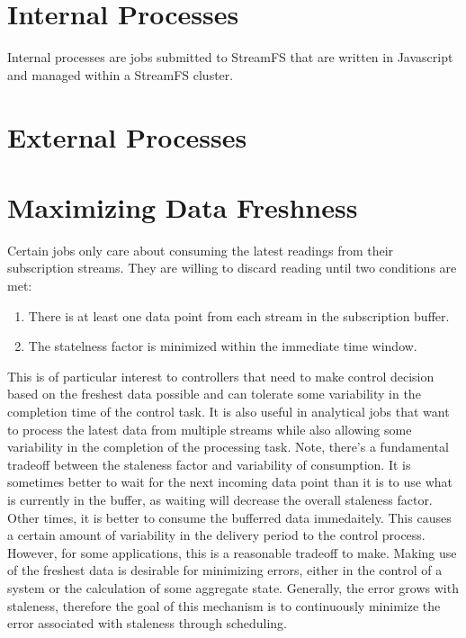 \section{Internal Processes}
Internal processes are jobs submitted to StreamFS that are written in Javascript and managed within a StreamFS cluster.




\section{External Processes}


\section{Maximizing Data Freshness}
Certain jobs only care about consuming the latest readings from their subscription streams.  They are willing to discard reading until two
conditions are met:

\begin{enumerate}
\item There is at least one data point from each stream in the subscription buffer.
\item The statelness factor is minimized within the immediate time window.
\end{enumerate}

This is of particular interest to controllers that need to make control decision based on the freshest data possible and can tolerate some variability
in the completion time of the control task.  It is also useful in analytical jobs that want to process the latest data from multiple streams while also
allowing some variability in the completion of the processing task.  Note, there's a fundamental tradeoff
between the staleness factor and variability of consumption.  It is sometimes better to wait for the next incoming data point than it is to use what
is currently in the buffer, as waiting will decrease the overall staleness factor.  Other times, it is better to consume the bufferred data immedaitely.
This causes a certain amount of variability in the delivery period to the control process.  However, for some applications, this is a reasonable tradeoff
to make.  Making use of the freshest data is desirable for minimizing errors, either in the control of a system or the calculation of some aggregate state.
Generally, the error grows with staleness, therefore the goal of this mechanism is to continuously minimize the error associated with staleness through
scheduling.



